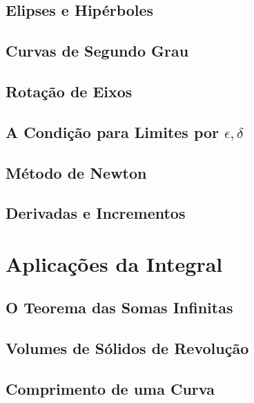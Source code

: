 \documentclass{svmono}
\begin{document}
\section{Elipses e Hipérboles}
\label{sec:ellipses}

\section{Curvas de Segundo Grau}
\label{sec:seconddegcurves}

\section{Rotação de Eixos}
\label{sec:rotationaxes}

\section{A Condição para Limites por $\epsilon, \delta$}
\label{sec:epsilondelta}

\section{Método de Newton}
\label{sec:newtonmethod}

\section{Derivadas e Incrementos}
\label{sec:derivsinc}

\chapterproblems

\chapter{Aplicações da Integral}
\label{chp:applint}

\section{O Teorema das Somas Infinitas}
\label{sec:infsumtheo}

\section{Volumes de Sólidos de Revolução}
\label{sec:solidrev}

\section{Comprimento de uma Curva}
\label{sec:curvelength}
\end{document}
